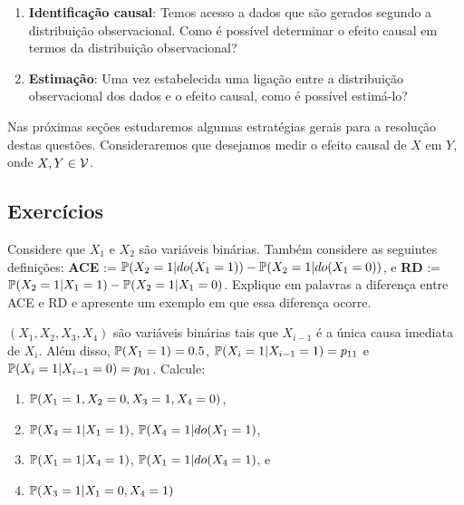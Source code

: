 \begin{enumerate}
 \item \textbf{Identificação causal}: Temos acesso a dados que 
 são gerados segundo a distribuição observacional.
 Como é possível determinar o efeito causal
 em termos da distribuição observacional?
 
 \item \textbf{Estimação}: Uma vez estabelecida 
 uma ligação entre a distribuição observacional dos dados e
 o efeito causal, como é possível estimá-lo?
\end{enumerate}

Nas próximas seções estudaremos 
algumas estratégias gerais para 
a resolução destas questões.
Consideraremos que desejamos medir
o efeito causal de $X$ em $Y$, 
onde $X, Y \in \sV$.

\subsection{Exercícios}

\begin{exercise}
 Considere que $X_1$ e $X_2$ são variáveis binárias.
 Também considere as seguintes definições:
 \textbf{ACE} := $\P(X_2=1|do(X_1=1))-\P(X_2=1|do(X_1=0))$, e
 \textbf{RD} := $\P(X_2=1|X_1=1)-\P(X_2=1|X_1=0)$.
 Explique em palavras a diferença entre ACE e RD e
 apresente um exemplo em que essa diferença ocorre.
\end{exercise}

\begin{exercise}
 $(X_1,X_2,X_3,X_4)$ são 
 variáveis binárias tais que
 $X_{i-1}$ é a única causa imediata de $X_i$.
 Além disso, $\P(X_1=1)=0.5$,
 $\P(X_i=1|X_{i-1}=1)=p_{11}$ e
 $\P(X_i=1|X_{i-1}=0)=p_{01}$.
 Calcule:
 \begin{enumerate}[label=(\alph*)]
  \item $\P(X_1=1,X_2=0,X_3=1,X_4=0)$,
  \item $\P(X_4=1|X_1=1)$, $\P(X_4=1|do(X_1=1)$, 
  \item $\P(X_1=1|X_4=1)$, $\P(X_1=1|do(X_4=1)$, e
  \item $\P(X_3=1|X_1=0,X_4=1)$
 \end{enumerate}
\end{exercise}


